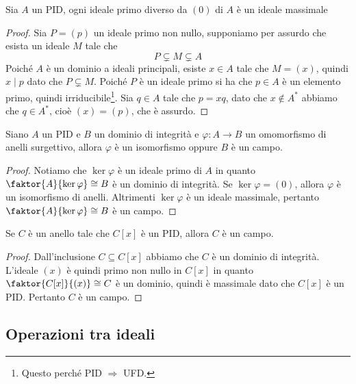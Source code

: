 \documentclass[11pt]{scrartcl}
\begin{document}
\begin{proposition}
    Sia $A$ un PID, ogni ideale primo diverso da $(0)$ di $A$ è un ideale 
    massimale
\end{proposition}

\begin{proof}
    Sia $P = (p)$ un ideale primo non nullo, supponiamo per assurdo che esista
    un ideale $M$ tale che 
    \[
        P \subsetneq M \subsetneq A
    \]
    Poiché $A$ è un dominio a ideali principali, esiste $x \in A$ tale che 
    $M = (x)$, quindi $x \mid p$ dato che $P \subsetneq M$. Poiché $P$ è 
    un ideale primo si ha che $p \in A$ è un elemento primo, quindi 
    irriducibile\footnote{
        Questo perché PID $\Longrightarrow$ UFD.
    }. Sia $q \in A$ tale che $p = xq$, dato che $x \notin A^*$ abbiamo che 
    $q \in A^*$, cioè $(x) = (p)$, che è assurdo.
\end{proof}

\begin{corollary}
    Siano $A$ un PID e $B$ un dominio di integrità e $\varphi: A \longrightarrow B$
    un omomorfismo di anelli surgettivo, allora $\varphi$ è un isomorfismo
    oppure $B$ è un campo. 
\end{corollary}

\begin{proof}
    Notiamo che $\ker \varphi$ è un ideale primo di $A$ in quanto $\faktor{A}{\ker\varphi}
    \cong B$ è un dominio di integrità. Se $\ker\varphi = (0)$, allora 
    $\varphi$ è un isomorfismo di anelli. Altrimenti $\ker\varphi$ è un ideale
    massimale, pertanto $\faktor{A}{\ker\varphi}\cong B$ è un campo.
\end{proof}

\begin{corollary}
    Se $C$ è un anello tale che $C[x]$ è un PID, allora $C$ è un campo.
\end{corollary}

\begin{proof}
    Dall'inclusione $C \subseteq C[x]$ abbiamo che $C$ è un dominio di integrità.
    L'ideale $(x)$ è quindi primo non nullo in $C[x]$ in quanto $\faktor{C[x]}{(x)} \cong C$
    è un dominio, quindi è massimale dato che $C[x]$ è un PID. Pertanto 
    $C$ è un campo.
\end{proof}

\newpage

\subsection{Operazioni tra ideali}
\end{document}
